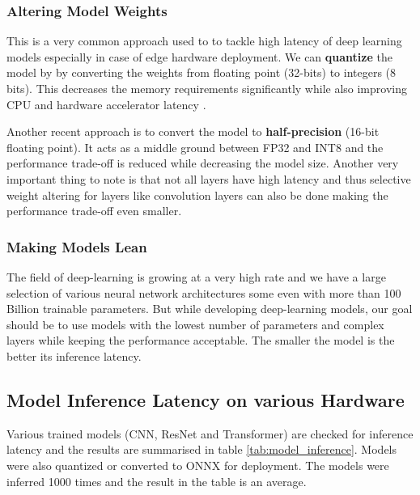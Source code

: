 \subsubsection{Altering Model Weights}
This is a very common approach used to to tackle high latency of deep learning models especially in case of edge hardware deployment. We can \textbf{quantize} the model by by converting the weights from floating point (32-bits) to integers (8 bits). This decreases the memory requirements significantly while also improving CPU and hardware accelerator latency \citep{FastModels}. 

Another recent approach is to convert the model to \textbf{half-precision} (16-bit floating point). It acts as a middle ground between FP32 and INT8 and the performance trade-off is reduced while decreasing the model size. Another very important thing to note is that not all layers have high latency and thus selective weight altering for layers like convolution layers can also be done making the performance trade-off even smaller.

\subsubsection{Making Models Lean}
The field of deep-learning is growing at a very high rate and we have a large selection of various neural network architectures some even with more than 100 Billion trainable parameters. But while developing deep-learning models, our goal should be to use models with the lowest number of parameters and complex layers while keeping the performance acceptable. The smaller the model is the better its inference latency. 
\subsection{Model Inference Latency on various Hardware}
Various trained models (CNN, ResNet and Transformer) are checked for inference latency and the results are summarised in table \ref{tab:model_inference}. Models were also quantized or converted to ONNX for deployment. The models were inferred 1000 times and the result in the table is an average.

